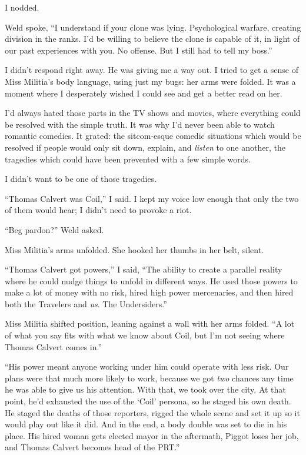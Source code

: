 I nodded.



Weld spoke, ``I understand if your clone was lying.  Psychological warfare, creating division in the ranks.  I'd be willing to believe the clone is capable of it, in light of our past experiences with you.  No offense.  But I still had to tell my boss.''



I didn't respond right away.  He was giving me a way out.  I tried to get a sense of Miss Militia's body language, using just my bugs: her arms were folded.  It was a moment where I desperately wished I could see and get a better read on her.



I'd always hated those parts in the TV shows and movies, where everything could be resolved with the simple truth.  It was why I'd never been able to watch romantic comedies.  It grated: the sitcom-esque comedic situations which would be resolved if people would only sit down, explain, and \emph{listen} to one another, the tragedies which could have been prevented with a few simple words.



I didn't want to be one of those tragedies.



``Thomas Calvert was Coil,'' I said.  I kept my voice low enough that only the two of them would hear; I didn't need to provoke a riot.



``Beg pardon?'' Weld asked.



Miss Militia's arms unfolded.  She hooked her thumbs in her belt, silent.



``Thomas Calvert got powers,'' I said, ``The ability to create a parallel reality where he could nudge things to unfold in different ways.  He used those powers to make a lot of money with no risk, hired high power mercenaries, and then hired both the Travelers and \emph{us}.  The Undersiders.''



Miss Militia shifted position, leaning against a wall with her arms folded.  ``A lot of what you say fits with what we know about Coil, but I'm not seeing where Thomas Calvert comes in.''



``His power meant anyone working under him could operate with less risk.  Our plans were that much more likely to work, because we got \emph{two} chances any time he was able to give us his attention.  With that, we took over the city.  At that point, he'd exhausted the use of the `Coil' persona, so he staged his own death.  He staged the deaths of those reporters, rigged the whole scene and set it up so it would play out like it did.  And in the end, a body double was set to die in his place.  His hired woman gets elected mayor in the aftermath, Piggot loses her job, and Thomas Calvert becomes head of the PRT.''



